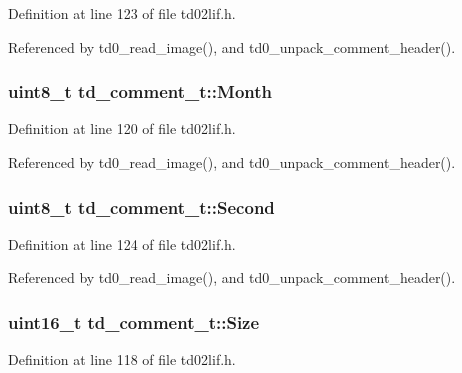 Definition at line 123 of file td02lif.\+h.



Referenced by td0\+\_\+read\+\_\+image(), and td0\+\_\+unpack\+\_\+comment\+\_\+header().

\subsubsection[{\texorpdfstring{Month}{Month}}]{\setlength{\rightskip}{0pt plus 5cm}uint8\+\_\+t td\+\_\+comment\+\_\+t\+::\+Month}\hypertarget{structtd__comment__t_ac926fbfad0e3544bb45bb05b7cd66c49}{}\label{structtd__comment__t_ac926fbfad0e3544bb45bb05b7cd66c49}


Definition at line 120 of file td02lif.\+h.



Referenced by td0\+\_\+read\+\_\+image(), and td0\+\_\+unpack\+\_\+comment\+\_\+header().

\subsubsection[{\texorpdfstring{Second}{Second}}]{\setlength{\rightskip}{0pt plus 5cm}uint8\+\_\+t td\+\_\+comment\+\_\+t\+::\+Second}\hypertarget{structtd__comment__t_ae89673be13e6cad1c83bd51034689248}{}\label{structtd__comment__t_ae89673be13e6cad1c83bd51034689248}


Definition at line 124 of file td02lif.\+h.



Referenced by td0\+\_\+read\+\_\+image(), and td0\+\_\+unpack\+\_\+comment\+\_\+header().

\subsubsection[{\texorpdfstring{Size}{Size}}]{\setlength{\rightskip}{0pt plus 5cm}uint16\+\_\+t td\+\_\+comment\+\_\+t\+::\+Size}\hypertarget{structtd__comment__t_aca61f38ae62a6de2ff0eab7da2c25e11}{}\label{structtd__comment__t_aca61f38ae62a6de2ff0eab7da2c25e11}


Definition at line 118 of file td02lif.\+h.



